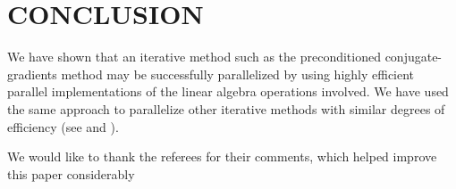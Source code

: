 \documentclass{ecai}
\begin{document}
\section{CONCLUSION}
We have shown that an iterative method such as the preconditioned
conjugate-gradients method may be successfully parallelized by using
highly efficient parallel implementations of the linear algebra
operations involved. We have used the same approach to parallelize
other iterative methods with similar degrees of efficiency (see
\cite{kn:daCunha92a} and \cite {kn:daCunha92b}).

\ack We would like to thank the referees for their comments, which
helped improve this paper considerably


\end{document}
